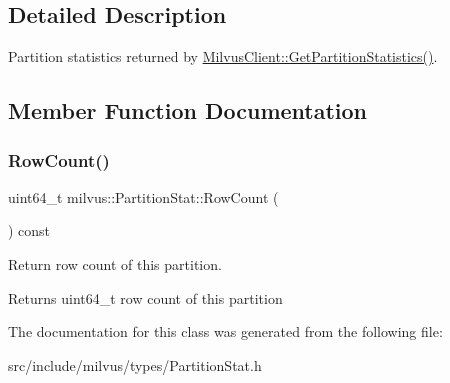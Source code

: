 \subsection{Detailed Description}
Partition statistics returned by \hyperlink{classmilvus_1_1_milvus_client_a91ad7ca6b18c8c1eafd10ea0d6af1c61}{Milvus\+Client\+::\+Get\+Partition\+Statistics()}. 

\subsection{Member Function Documentation}
\mbox{\label{classmilvus_1_1_partition_stat_a67137365a97dd5a4d62a993a9aa6b86e}} 
\subsubsection{\texorpdfstring{Row\+Count()}{RowCount()}}
{\footnotesize\ttfamily uint64\+\_\+t milvus\+::\+Partition\+Stat\+::\+Row\+Count (\begin{DoxyParamCaption}{ }\end{DoxyParamCaption}) const\hspace{0.3cm}{\ttfamily [inline]}}



Return row count of this partition. 

\begin{DoxyReturn}{Returns}
uint64\+\_\+t row count of this partition 
\end{DoxyReturn}


The documentation for this class was generated from the following file\+:\begin{DoxyCompactItemize}
\item 
src/include/milvus/types/Partition\+Stat.\+h\end{DoxyCompactItemize}
